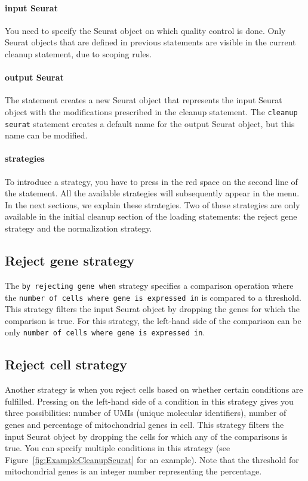 \paragraph{input Seurat} You need to specify the Seurat object on which quality control
is done. Only Seurat objects that are defined in previous statements are visible in the
current cleanup statement, due to scoping rules.

\paragraph{output Seurat} The statement creates a new Seurat object that represents the
input Seurat object with the modifications prescribed in the cleanup statement. The
\texttt{cleanup seurat} statement creates a default name for the output Seurat object,
but this name can be modified.

\paragraph{strategies} To introduce a strategy, you have to press \keys{\ctrl+\space}
in the red space on the second line of the statement. All the available strategies will
subsequently appear in the menu. In the next sections, we explain these strategies. Two
of these strategies are only available in the initial cleanup section of the loading
statements: the reject gene strategy and the normalization strategy.

\subsection{Reject gene strategy}
The \texttt{by rejecting gene when} strategy specifies a comparison operation where the
\texttt{number of cells where gene is expressed in} is compared to a threshold.
This strategy filters the input Seurat object by dropping the genes for which
the comparison is true. For this strategy, the left-hand side of the comparison can be
only \texttt{number of cells where gene is expressed in}.

\subsection{Reject cell strategy}
Another strategy is when you reject cells based on whether certain conditions are fulfilled.
Pressing \keys{\ctrl+\space} on the left-hand side of a condition in this strategy gives you
three possibilities: number of UMIs (unique molecular identifiers), number of genes and
percentage of mitochondrial genes in cell. This strategy filters the input Seurat object
by dropping the cells for which any of the comparisons is true. You can specify multiple
conditions in this strategy (see Figure~\ref{fig:ExampleCleanupSeurat} for an example). Note
that the threshold for mitochondrial genes is an integer number representing the percentage. 


